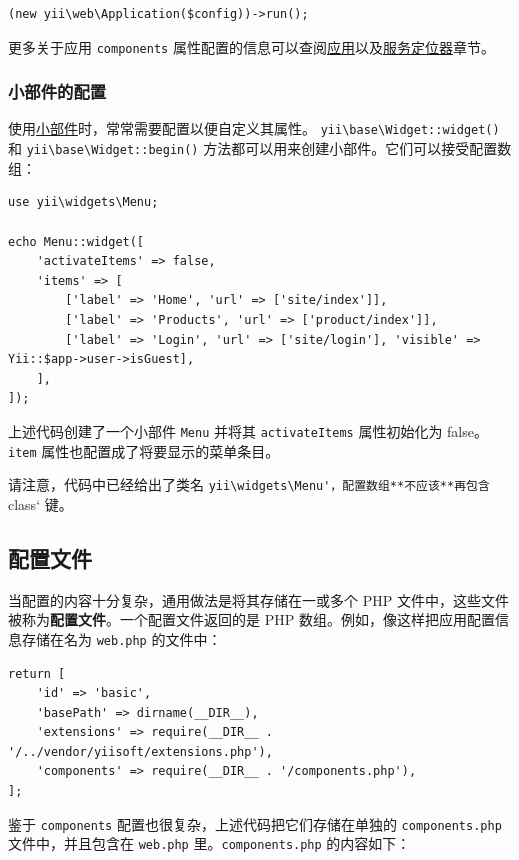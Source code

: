 \lstset{language=php}\begin{lstlisting}
(new yii\web\Application($config))->run();
\end{lstlisting}
更多关于应用 \lstinline|components| 属性配置的信息可以查阅\hyperref[structure-applications.md]{应用}以及\hyperref[concept-service-locator.md]{服务定位器}章节。

\subsubsection{小部件的配置 \label{concept-configurations.md::widget-configurations}}
使用\hyperref[structure-widgets.md]{小部件}时，常常需要配置以便自定义其属性。 \texttt{yii{\allowbreak{}\textbackslash}base{\allowbreak{}\textbackslash}Widget\allowbreak{}::\allowbreak{}widget()} 和  \texttt{yii{\allowbreak{}\textbackslash}base{\allowbreak{}\textbackslash}Widget\allowbreak{}::\allowbreak{}begin()} 方法都可以用来创建小部件。它们可以接受配置数组：

\lstset{language=php}\begin{lstlisting}
use yii\widgets\Menu;

echo Menu::widget([
    'activateItems' => false,
    'items' => [
        ['label' => 'Home', 'url' => ['site/index']],
        ['label' => 'Products', 'url' => ['product/index']],
        ['label' => 'Login', 'url' => ['site/login'], 'visible' => Yii::$app->user->isGuest],
    ],
]);
\end{lstlisting}
上述代码创建了一个小部件 \lstinline|Menu| 并将其 \lstinline|activateItems| 属性初始化为 false。\lstinline|item| 属性也配置成了将要显示的菜单条目。

请注意，代码中已经给出了类名 \lstinline|yii\widgets\Menu'，配置数组**不应该**再包含 |class` 键。

\subsection{配置文件 \label{concept-configurations.md::configuration-files}}
当配置的内容十分复杂，通用做法是将其存储在一或多个 PHP 文件中，这些文件被称为\textbf{配置文件}。一个配置文件返回的是 PHP 数组。例如，像这样把应用配置信息存储在名为 \lstinline|web.php| 的文件中：

\lstset{language=php}\begin{lstlisting}
return [
    'id' => 'basic',
    'basePath' => dirname(__DIR__),
    'extensions' => require(__DIR__ . '/../vendor/yiisoft/extensions.php'),
    'components' => require(__DIR__ . '/components.php'),
];
\end{lstlisting}
鉴于 \lstinline|components| 配置也很复杂，上述代码把它们存储在单独的 \lstinline|components.php| 文件中，并且包含在 \lstinline|web.php| 里。\lstinline|components.php| 的内容如下：

